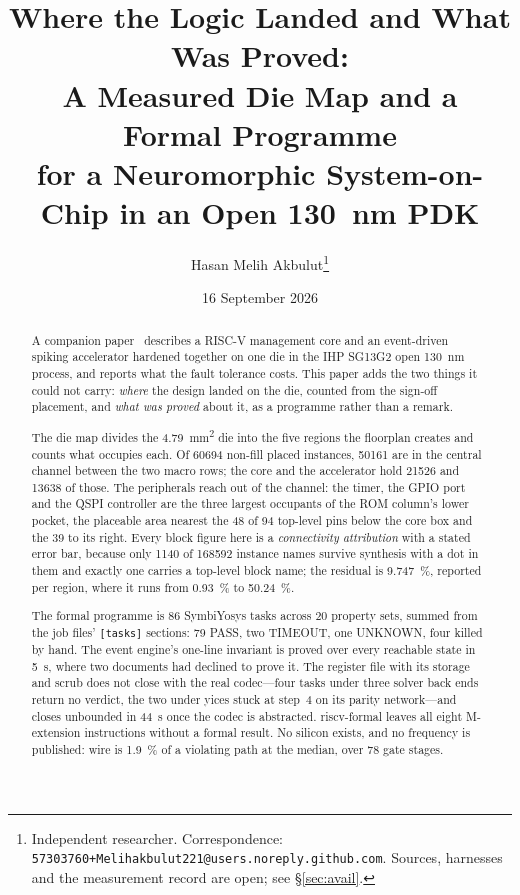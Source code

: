 \documentclass[11pt,a4paper]{article}
\title{Where the Logic Landed and What Was Proved:\\
A Measured Die Map and a Formal Programme\\
for a Neuromorphic System-on-Chip in an Open \SI{130}{\nano\meter} PDK}
\author{Hasan Melih Akbulut\thanks{Independent researcher.
Correspondence: \texttt{57303760+Melihakbulut221@users.noreply.github.com}.
Sources, harnesses and the measurement record are open; see
\S\ref{sec:avail}.}}
\date{16 September 2026}
\begin{document}
\maketitle

\begin{abstract}
A companion paper~\cite{companion_design} describes a RISC-V management
core and an event-driven spiking accelerator hardened together on one
die in the IHP SG13G2 open \SI{130}{\nano\meter} process, and reports
what the fault tolerance costs. This paper adds the two things it could
not carry: \emph{where} the design landed on the die, counted from the
sign-off placement, and \emph{what was proved} about it, as a programme
rather than a remark.

The die map divides the \SI{4.79}{\milli\meter\squared} die into the
five regions the floorplan creates and counts what occupies each. Of
\num{60694} non-fill placed instances, \num{50161} are in the central
channel between the two macro rows; the core and the accelerator hold
\num{21526} and \num{13638} of those. The peripherals reach out of the
channel: the timer, the GPIO port and the QSPI controller are the three
largest occupants of the ROM column's lower pocket, the placeable area
nearest the \num{48} of \num{94} top-level pins below the core box and
the \num{39} to its right. Every block figure here is a
\emph{connectivity attribution} with a stated error bar, because only
\num{1140} of \num{168592} instance names survive synthesis with a dot
in them and exactly one carries a top-level block name; the residual is
\SI{9.747}{\percent}, reported per region, where it runs from
\SI{0.93}{\percent} to \SI{50.24}{\percent}.

The formal programme is \num{86} SymbiYosys tasks across \num{20}
property sets, summed from the job files' \texttt{[tasks]} sections:
\num{79} PASS, two TIMEOUT, one UNKNOWN, four killed by hand. The event
engine's one-line invariant is proved over every reachable state in
\SI{5}{\second}, where two documents had declined to prove it. The
register file with its storage and scrub does not close with the real
codec---four tasks under three solver back ends return no verdict, the
two under yices stuck at step~4 on its parity network---and closes
unbounded in \SI{44}{\second} once the codec is abstracted.
riscv-formal leaves all eight M-extension instructions without a formal
result. No silicon exists, and no
frequency is published: wire is \SI{1.9}{\percent} of a violating path
at the median, over \num{78} gate stages.
\end{abstract}
\end{document}
